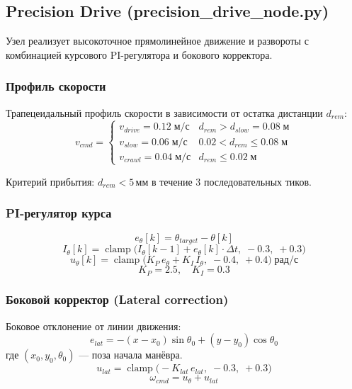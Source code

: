 \documentclass[12pt, a4paper]{article}
\DeclareMathOperator{\clamp}{clamp}
\begin{document}
\subsection{Precision Drive (precision\_drive\_node.py)}
\label{sec:precision_drive}

Узел реализует высокоточное прямолинейное движение и развороты с комбинацией курсового PI-регулятора и бокового корректора.

\subsubsection{Профиль скорости}

Трапецеидальный профиль скорости в зависимости от остатка дистанции $d_{rem}$:
\begin{equation}
  v_{cmd} =
  \begin{cases}
    v_{drive} = 0.12\;\text{м/с}  & d_{rem} > d_{slow} = 0.08\;\text{м} \\
    v_{slow}  = 0.06\;\text{м/с}  & 0.02 < d_{rem} \leq 0.08\;\text{м} \\
    v_{crawl} = 0.04\;\text{м/с}  & d_{rem} \leq 0.02\;\text{м}
  \end{cases}
\end{equation}

Критерий прибытия: $d_{rem} < 5$\,мм в течение 3 последовательных тиков.

\subsubsection{PI-регулятор курса}
\begin{equation}
  e_\theta[k] = \theta_{target} - \theta[k]
\end{equation}
\begin{equation}
  I_\theta[k] = \clamp\!\bigl(I_\theta[k-1] + e_\theta[k]\cdot\Delta t,\; -0.3,\; +0.3\bigr)
\end{equation}
\begin{equation}
  u_\theta[k] = \clamp\!\bigl(K_P\,e_\theta + K_I\,I_\theta,\; -0.4,\; +0.4\bigr)\;\text{рад/с}
\end{equation}
\begin{equation}
  K_P = 2.5,\quad K_I = 0.3
\end{equation}

\subsubsection{Боковой корректор (Lateral correction)}
Боковое отклонение от линии движения:
\begin{equation}
  e_{lat} = -(x - x_0)\sin\theta_0 + (y - y_0)\cos\theta_0
\end{equation}
где $(x_0, y_0, \theta_0)$ — поза начала манёвра.
\begin{equation}
  u_{lat} = \clamp\!\bigl(-K_{lat}\,e_{lat},\; -0.3,\; +0.3\bigr)
\end{equation}
\begin{equation}
  \omega_{cmd} = u_\theta + u_{lat}
\end{equation}
\end{document}
